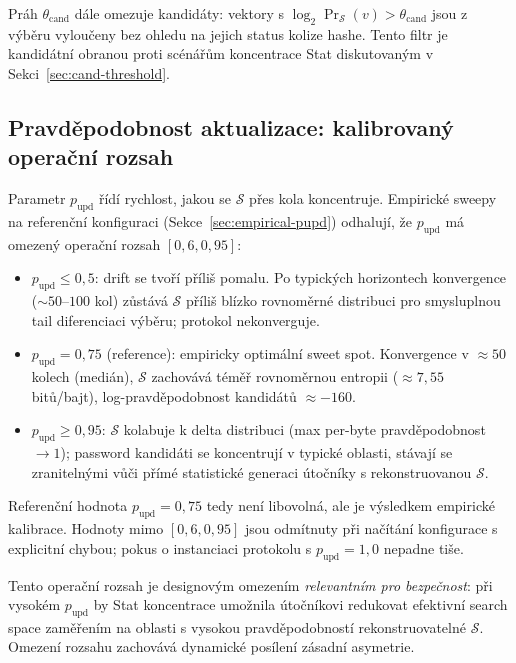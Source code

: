 \documentclass[11pt,a4paper]{article}
\begin{document}
Práh $\theta_\text{cand}$ dále omezuje kandidáty: vektory s $\log_2 \Pr_\mathcal{S}(v) > \theta_\text{cand}$ jsou z výběru vyloučeny bez ohledu na jejich status kolize hashe. Tento filtr je kandidátní obranou proti scénářům koncentrace Stat diskutovaným v Sekci~\ref{sec:cand-threshold}.

\subsection{Pravděpodobnost aktualizace: kalibrovaný operační rozsah}\label{sec:p-upd}

Parametr $p_\text{upd}$ řídí rychlost, jakou se $\mathcal{S}$ přes kola koncentruje. Empirické sweepy na referenční konfiguraci (Sekce~\ref{sec:empirical-pupd}) odhalují, že $p_\text{upd}$ má omezený operační rozsah $[0{,}6, 0{,}95]$:

\begin{itemize}[leftmargin=*]
\item $p_\text{upd} \leq 0{,}5$: drift se tvoří příliš pomalu. Po typických horizontech konvergence ($\sim 50$--$100$ kol) zůstává $\mathcal{S}$ příliš blízko rovnoměrné distribuci pro smysluplnou tail diferenciaci výběru; protokol nekonverguje.
\item $p_\text{upd} = 0{,}75$ (reference): empiricky optimální sweet spot. Konvergence v $\approx 50$ kolech (medián), $\mathcal{S}$ zachovává téměř rovnoměrnou entropii ($\approx 7{,}55$ bitů/bajt), log-pravděpodobnost kandidátů $\approx -160$.
\item $p_\text{upd} \geq 0{,}95$: $\mathcal{S}$ kolabuje k delta distribuci (max per-byte pravděpodobnost $\to 1$); password kandidáti se koncentrují v typické oblasti, stávají se zranitelnými vůči přímé statistické generaci útočníky s rekonstruovanou $\mathcal{S}$.
\end{itemize}

Referenční hodnota $p_\text{upd} = 0{,}75$ tedy není libovolná, ale je výsledkem empirické kalibrace. Hodnoty mimo $[0{,}6, 0{,}95]$ jsou odmítnuty při načítání konfigurace s explicitní chybou; pokus o instanciaci protokolu s $p_\text{upd} = 1{,}0$ nepadne tiše.

Tento operační rozsah je designovým omezením \emph{relevantním pro bezpečnost}: při vysokém $p_\text{upd}$ by Stat koncentrace umožnila útočníkovi redukovat efektivní search space zaměřením na oblasti s vysokou pravděpodobností rekonstruovatelné $\mathcal{S}$. Omezení rozsahu zachovává dynamické posílení zásadní asymetrie.
\end{document}
